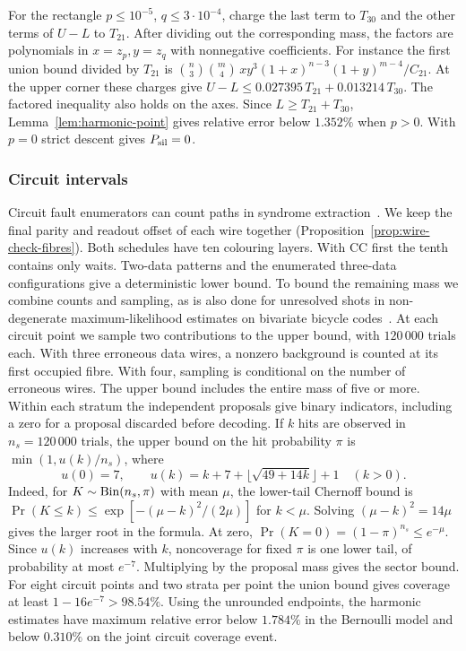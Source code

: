 \documentclass[10pt,twocolumn]{article}
\theoremstyle{definition}
\begin{document}
For the rectangle $p\le10^{-5}$, $q\le3\cdot10^{-4}$, charge the
last term to $T_{30}$ and the other terms of $U-L$ to $T_{21}$.
After dividing out the corresponding mass, the factors are
polynomials in $x=z_p,y=z_q$ with nonnegative coefficients.
For instance the first union bound divided by $T_{21}$ is
$\binom n3\binom m4\,xy^3(1+x)^{n-3}(1+y)^{m-4}/C_{21}$.
At the upper corner these charges give
$U-L\le0.027395\,T_{21}+0.013214\,T_{30}$. The factored
inequality also holds on the axes. Since $L\ge T_{21}+T_{30}$,
Lemma~\ref{lem:harmonic-point} gives relative error below $1.352\%$
when $p>0$. With $p=0$ strict descent gives $P_{\rm sil}=0$.

\subsubsection{Circuit intervals}
Circuit fault enumerators can count paths in syndrome
extraction~\cite{KL24}. We keep the final parity and readout offset
of each wire together (Proposition~\ref{prop:wire-check-fibres}).
Both schedules have ten colouring layers. With CC first the tenth
contains only waits. Two-data patterns and the enumerated three-data
configurations give a deterministic lower bound. To bound the
remaining mass we combine counts and sampling, as is also done for
unresolved shots in non-degenerate maximum-likelihood estimates on
bivariate bicycle codes~\cite[Sec.~VI and Fig.~1]{Banfi26}. At each
circuit point we sample two contributions to the upper bound, with
$120\,000$ trials each. With three
erroneous data wires, a nonzero background is counted at its first
occupied fibre. With four, sampling is conditional on the number of
erroneous wires. The upper bound includes the entire mass of five
or more. Within each stratum the independent proposals give binary
indicators, including a zero for a proposal discarded before decoding.
If $k$ hits are observed in $n_s=120\,000$ trials, the upper bound on
the hit probability $\pi$ is $\min(1,u(k)/n_s)$, where
\[
 u(0)=7,\qquad
 u(k)=k+7+\lfloor\sqrt{49+14k}\rfloor+1\quad(k>0).
\]
Indeed, for $K\sim{\rm Bin}(n_s,\pi)$ with mean $\mu$, the lower-tail
Chernoff bound is $\Pr(K\le k)\le\exp[-(\mu-k)^2/(2\mu)]$ for
$k<\mu$. Solving $(\mu-k)^2=14\mu$ gives the larger root in the
formula. At zero, $\Pr(K=0)=(1-\pi)^{n_s}\le e^{-\mu}$.
Since $u(k)$ increases with $k$, noncoverage for fixed $\pi$ is one
lower tail, of probability at most $e^{-7}$. Multiplying by the
proposal mass gives the sector bound. For eight circuit points and
two strata per point the union bound gives coverage at least
$1-16e^{-7}>98.54\%$.
Using the unrounded endpoints, the harmonic estimates have maximum
relative error below $1.784\%$ in the Bernoulli model and below
$0.310\%$ on the joint circuit coverage event.
\end{document}
